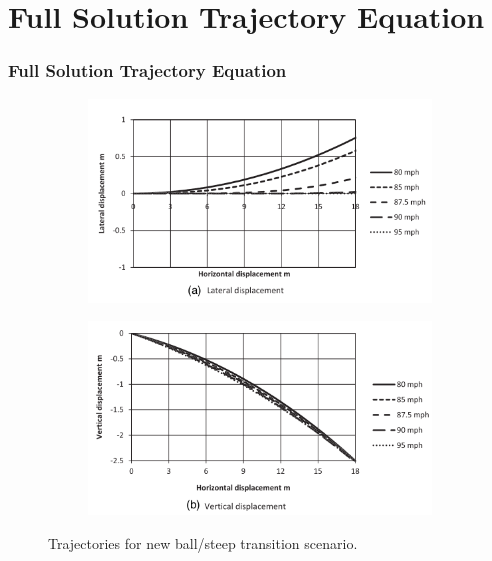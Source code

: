 \documentclass{beamer}
\begin{document}
\section{Full Solution Trajectory Equation}
\begin{frame}
\frametitle{Full Solution Trajectory Equation}

\begin{figure}[h!]
  \centering
  \begin{subfigure}[b]{0.5\linewidth}
    \includegraphics[width=\linewidth]{./figs/fs_3.png}
  \end{subfigure}
  \begin{subfigure}[b]{0.5\linewidth}
    \includegraphics[width=\linewidth]{./figs/fs_4.png}
  \end{subfigure}
  \caption{Trajectories for new ball/steep transition scenario.}
  \label{fig:fs34}
\end{figure}
\end{frame}
\end{document}
